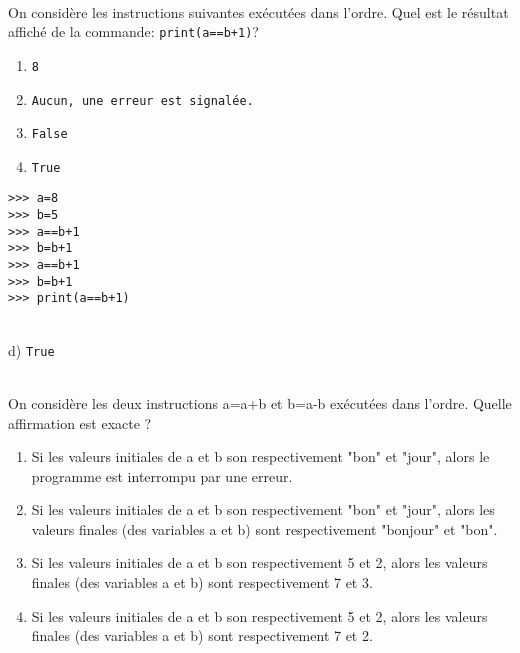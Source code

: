 \documentclass[a4paper,12pt]{article}
\begin{document}
\exo{}  ~\\ 
On considère les instructions suivantes exécutées dans l'ordre.
Quel est le résultat affiché de la commande: \lstinline{print(a==b+1)}?
\begin{multicols}{2}
	\begin{enumerate}[label=\alph*)]
		\item \lstinline{8}
		\item \lstinline{Aucun, une erreur est signalée.}
		\item \lstinline{False}
		\item \lstinline{True}
	\end{enumerate}
\end{multicols}
\begin{lstlisting}[numbers=none]
>>> a=8
>>> b=5
>>> a==b+1
>>> b=b+1
>>> a==b+1
>>> b=b+1
>>> print(a==b+1)
\end{lstlisting}
\begin{correction}
	~\\ 
	d) \lstinline{True}
\end{correction}
\finexo
\exo{}  ~\\ 
On considère les deux instructions a=a+b et b=a-b exécutées dans l'ordre. Quelle affirmation est exacte ?
	\begin{enumerate}[label=\alph*)]
		\item Si les valeurs initiales de a et b son respectivement "bon" et "jour", alors le programme est interrompu par une erreur.
		\item Si les valeurs initiales de a et b son respectivement "bon" et "jour", alors les valeurs finales (des variables a et b) sont respectivement "bonjour" et "bon".
		\item Si les valeurs initiales de a et b son respectivement 5 et 2, alors les valeurs finales (des variables a et b) sont respectivement 7 et 3.
		\item Si les valeurs initiales de a et b son respectivement 5 et 2, alors les valeurs finales (des variables a et b) sont respectivement 7 et 2.
	\end{enumerate}
\end{document}
